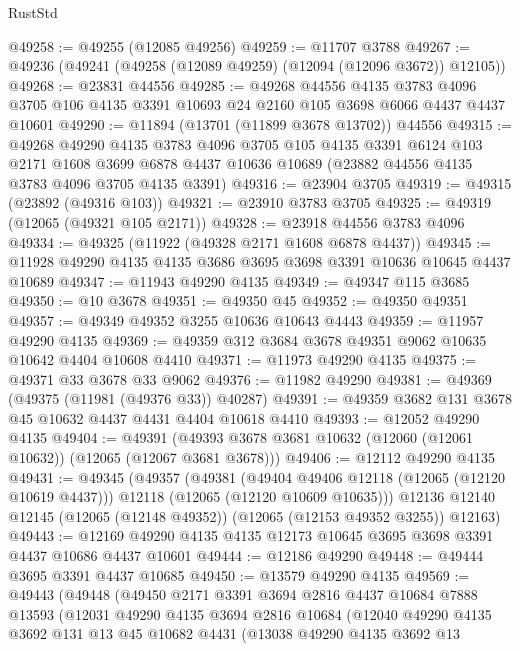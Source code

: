 \begin{lexlean}{RustStd}
\begin{coremodule}
@49258 := @49255 (@12085 @49256)
@49259 := @11707 @3788
@49267 := @49236 (@49241 (@49258 (@12089 @49259) (@12094 (@12096 @3672)) @12105))
@49268 := @23831 @44556
@49285 := @49268
    @44556
    @4135
    @3783
    @4096
    @3705
    @106
    @4135
    @3391
    @10693
    @24
    @2160
    @105
    @3698
    @6066
    @4437
    @4437
    @10601
@49290 := @11894 (@13701 (@11899 @3678 @13702)) @44556
@49315 := @49268
    @49290
    @4135
    @3783
    @4096
    @3705
    @105
    @4135
    @3391
    @6124
    @103
    @2171
    @1608
    @3699
    @6878
    @4437
    @10636
    @10689
    (@23882 @44556 @4135 @3783 @4096 @3705 @4135 @3391)
@49316 := @23904 @3705
@49319 := @49315 (@23892 (@49316 @103))
@49321 := @23910 @3783 @3705
@49325 := @49319 (@12065 (@49321 @105 @2171))
@49328 := @23918 @44556 @3783 @4096
@49334 := @49325 (@11922 (@49328 @2171 @1608 @6878 @4437))
@49345 := @11928 @49290 @4135 @4135 @3686 @3695 @3698 @3391 @10636 @10645 @4437 @10689
@49347 := @11943 @49290 @4135
@49349 := @49347 @115 @3685
@49350 := @10 @3678
@49351 := @49350 @45
@49352 := @49350 @49351
@49357 := @49349 @49352 @3255 @10636 @10643 @4443
@49359 := @11957 @49290 @4135
@49369 := @49359 @312 @3684 @3678 @49351 @9062 @10635 @10642 @4404 @10608 @4410
@49371 := @11973 @49290 @4135
@49375 := @49371 @33 @3678 @33 @9062
@49376 := @11982 @49290
@49381 := @49369 (@49375 (@11981 (@49376 @33)) @40287)
@49391 := @49359 @3682 @131 @3678 @45 @10632 @4437 @4431 @4404 @10618 @4410
@49393 := @12052 @49290 @4135
@49404 := @49391 (@49393 @3678 @3681 @10632 (@12060 (@12061 @10632)) (@12065 (@12067 @3681 @3678)))
@49406 := @12112 @49290 @4135
@49431 := @49345
    (@49357
      (@49381
        (@49404 @49406 @12118 (@12065 (@12120 @10619 @4437)))
        @12118
        (@12065 (@12120 @10609 @10635)))
      @12136
      @12140
      @12145
      (@12065 (@12148 @49352))
      (@12065 (@12153 @49352 @3255))
      @12163)
@49443 := @12169 @49290 @4135 @4135 @12173 @10645 @3695 @3698 @3391 @4437 @10686 @4437 @10601
@49444 := @12186 @49290
@49448 := @49444 @3695 @3391 @4437 @10685
@49450 := @13579 @49290 @4135
@49569 := @49443
    (@49448
      (@49450
        @2171
        @3391
        @3694
        @2816
        @4437
        @10684
        @7888
        @13593
        (@12031
          @49290
          @4135
          @3694
          @2816
          @10684
          (@12040
            @49290
            @4135
            @3692
            @131
            @13
            @45
            @10682
            @4431
            (@13038
              @49290
              @4135
              @3692
              @13

\end{coremodule}
\end{lexlean}
